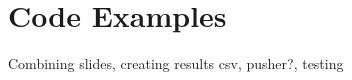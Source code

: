\chapter{Code Examples}
\label{appendix:code}
Combining slides, creating results csv, pusher?, testing